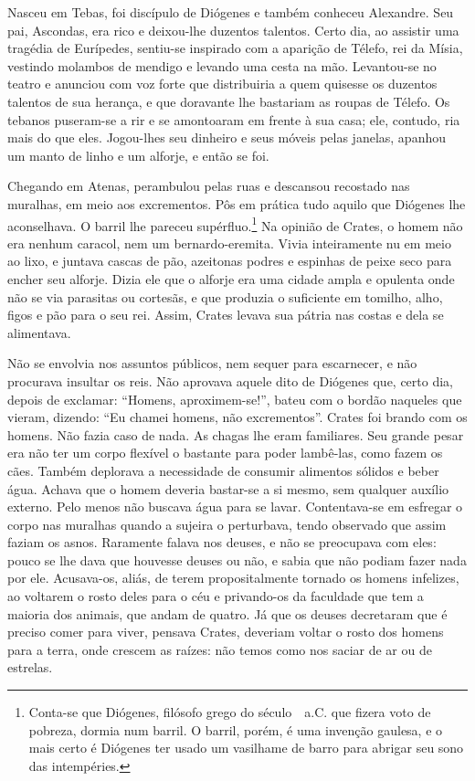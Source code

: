 Nasceu em Tebas, foi discípulo de Diógenes e também conheceu Alexandre. Seu
pai, Ascondas, era rico e deixou-lhe duzentos talentos. Certo dia, ao
assistir uma tragédia de Eurípedes, sentiu-se inspirado com a aparição de
Télefo, rei da Mísia, vestindo molambos de mendigo e levando uma cesta na
mão. Levantou-se no teatro e anunciou com voz forte que distribuiria a
quem quisesse os duzentos talentos de sua herança, e que doravante lhe
bastariam as roupas de Télefo. Os tebanos puseram-se a rir e se amontoaram
em frente à sua casa; ele, contudo, ria mais do que eles. Jogou-lhes seu
dinheiro e seus móveis pelas janelas, apanhou um manto de linho e um
alforje, e então se foi.

Chegando em Atenas, perambulou pelas ruas e descansou recostado nas
muralhas, em meio aos excrementos. Pôs em prática tudo aquilo que Diógenes
lhe aconselhava. O barril lhe pareceu supérfluo.\footnote{ Conta-se que
Diógenes, filósofo grego do século~~a.C. que fizera voto de pobreza,
dormia num barril. O barril, porém, é uma invenção gaulesa, e o mais certo
é Diógenes ter usado um vasilhame de barro para abrigar seu sono das intempéries.} 
Na opinião de Crates, o homem não era nenhum
caracol, nem um bernardo-eremita. Vivia inteiramente nu em meio ao lixo, e
juntava cascas de pão, azeitonas podres e espinhas de peixe seco para
encher seu alforje. Dizia ele que o alforje era uma cidade ampla e
opulenta onde não se via parasitas ou cortesãs, e que produzia o
suficiente em tomilho, alho, figos e pão para o seu rei. Assim, Crates
levava sua pátria nas costas e dela se alimentava.

Não se envolvia nos assuntos públicos, nem sequer para escarnecer, e não
procurava insultar os reis. Não aprovava aquele dito de Diógenes que,
certo dia, depois de exclamar: “Homens, aproximem-se!”, bateu com o bordão
naqueles que vieram, dizendo: “Eu chamei homens, não excrementos”. Crates
foi brando com os homens. Não fazia caso de nada. As chagas lhe eram
familiares. Seu grande pesar era não ter um corpo flexível o bastante para
poder lambê-las, como fazem os cães. Também deplorava a necessidade de
consumir alimentos sólidos e beber água. Achava que o homem deveria
bastar-se a si mesmo, sem qualquer auxílio externo. Pelo menos não buscava
água para se lavar. Contentava-se em esfregar o corpo nas muralhas quando
a sujeira o perturbava, tendo observado que assim faziam os asnos.
Raramente falava nos deuses, e não se preocupava com eles: pouco se lhe
dava que houvesse deuses ou não, e sabia que não podiam fazer nada por
ele. Acusava-os, aliás, de terem propositalmente tornado os homens
infelizes, ao voltarem o rosto deles para o céu e privando-os da faculdade
que tem a maioria dos animais, que andam de quatro. Já que os deuses
decretaram que é preciso comer para viver, pensava Crates, deveriam voltar
o rosto dos homens para a terra, onde crescem as raízes: não temos como
nos saciar de ar ou de estrelas.

